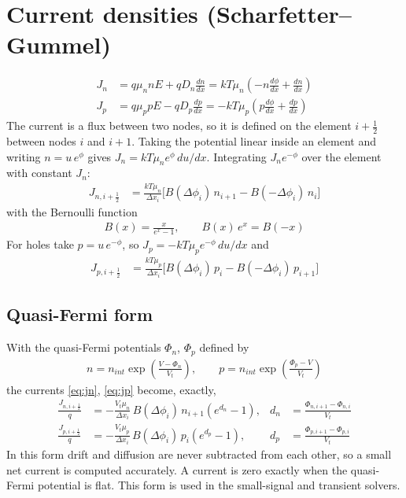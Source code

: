 \documentclass[11pt]{article}
\newcommand{\dphi}[1]{\Delta\phi_{#1}}
\newcommand{\half}{\tfrac{1}{2}}
\begin{document}
\section{Current densities (Scharfetter--Gummel)}
\begin{align}
J_n &= q\mu_n nE + qD_n\frac{dn}{dx} = kT\mu_n\left(-n\frac{d\phi}{dx}+\frac{dn}{dx}\right)\\
J_p &= q\mu_p pE - qD_p\frac{dp}{dx} = -kT\mu_p\left(p\frac{d\phi}{dx}+\frac{dp}{dx}\right)
\end{align}
The current is a flux between two nodes, so it is defined on the element $i+\half$ between nodes $i$ and
$i+1$. Taking the potential linear inside an element and writing $n=u\,e^{\phi}$ gives
$J_n = kT\mu_n e^{\phi}\,du/dx$. Integrating $J_n e^{-\phi}$ over the element with constant $J_n$:
\begin{align}
J_{n,i+\half} &= \frac{kT\mu_n}{\Delta x_i}\Big[B(\dphi{i})\,n_{i+1}-B(-\dphi{i})\,n_i\Big] \label{eq:jn}
\end{align}
with the Bernoulli function
\begin{align}
B(x)=\frac{x}{e^{x}-1}, \qquad B(x)\,e^{x}=B(-x)
\end{align}
For holes take $p=u\,e^{-\phi}$, so $J_p=-kT\mu_p e^{-\phi}\,du/dx$ and
\begin{align}
J_{p,i+\half} &= \frac{kT\mu_p}{\Delta x_i}\Big[B(\dphi{i})\,p_i-B(-\dphi{i})\,p_{i+1}\Big] \label{eq:jp}
\end{align}

\subsection{Quasi-Fermi form}
With the quasi-Fermi potentials $\Phi_n$, $\Phi_p$ defined by
\begin{align}
n=n_{int}\exp\!\left(\frac{V-\Phi_n}{V_t}\right),\qquad p=n_{int}\exp\!\left(\frac{\Phi_p-V}{V_t}\right) \label{eq:qf}
\end{align}
the currents \eqref{eq:jn}, \eqref{eq:jp} become, exactly,
\begin{align}
\frac{J_{n,i+\half}}{q}&=-\frac{V_t\mu_n}{\Delta x_i}\,B(\dphi{i})\,n_{i+1}\left(e^{d_n}-1\right),
& d_n&=\frac{\Phi_{n,i+1}-\Phi_{n,i}}{V_t} \label{eq:jnqf}\\
\frac{J_{p,i+\half}}{q}&=-\frac{V_t\mu_p}{\Delta x_i}\,B(\dphi{i})\,p_i\left(e^{d_p}-1\right),
& d_p&=\frac{\Phi_{p,i+1}-\Phi_{p,i}}{V_t} \label{eq:jpqf}
\end{align}
In this form drift and diffusion are never subtracted from each other, so a small net current is computed
accurately. A current is zero exactly when the quasi-Fermi potential is flat. This form is used in the
small-signal and transient solvers.
\end{document}
